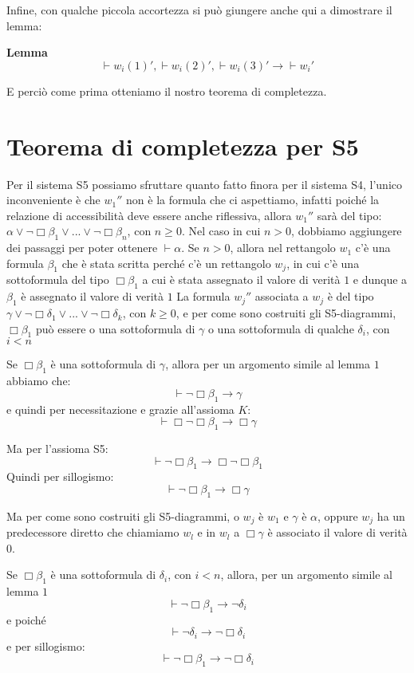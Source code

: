 \documentclass[a4paper, titlepage, 12pt]{report}
\begin{document}
Infine, con qualche piccola accortezza si può giungere anche qui a dimostrare il lemma:
\begin{flushleft}
\textbf{Lemma}
$$\vdash w_i(1)', \vdash w_i(2)', \vdash w_i(3)' \rightarrow \vdash w_i'$$
\end{flushleft}

E perciò come prima otteniamo il nostro teorema di completezza.

\section{Teorema di completezza per S5}
Per il sistema S5 possiamo sfruttare quanto fatto finora per il sistema S4,
l'unico inconveniente è che $w_1''$ non è la formula che ci aspettiamo,
infatti poiché la relazione di accessibilità deve essere anche riflessiva,
allora $w_1''$ sarà del tipo: $\alpha \lor \neg \Box \beta_1 \lor ... \lor \neg \Box \beta_n$,
con $n \ge 0$.
Nel caso in cui $n > 0$, dobbiamo aggiungere dei passaggi per poter ottenere $\vdash \alpha$.
Se $n > 0$, allora nel rettangolo $w_1$ c'è una formula $\beta_1$ che è stata scritta
perché c'è un rettangolo $w_j$,
in cui c'è una sottoformula del tipo $\Box \beta_1$
a cui è stata assegnato il valore di verità $1$ e dunque a $\beta_1$ è assegnato il valore di verità $1$
La formula $w_j''$ associata a $w_j$ è del tipo $\gamma \lor \neg \Box \delta_1 \lor ... \lor \neg \Box \delta_k$, con $k \ge 0$,
e per come sono costruiti gli S5-diagrammi, $\Box \beta_1$ può essere o una sottoformula di $\gamma$
o una sottoformula di qualche $\delta_i$, con $i < n$

Se $\Box \beta_1$ è una sottoformula di $\gamma$, allora per un argomento simile al lemma $1$ abbiamo che:
$$\vdash \neg \Box \beta_1 \rightarrow \gamma$$
e quindi per necessitazione e grazie all'assioma $K$:
$$\vdash \Box \neg \Box \beta_1 \rightarrow \Box \gamma$$

Ma per l'assioma S5:
$$\vdash \neg \Box \beta_1 \rightarrow \Box \neg \Box \beta_1$$
Quindi per sillogismo:
$$\vdash \neg \Box \beta_1 \rightarrow \Box \gamma$$

Ma per come sono costruiti gli S5-diagrammi, o $w_j$ è $w_1$ e $\gamma$ è $\alpha$,
oppure $w_j$ ha un predecessore diretto
che chiamiamo $w_l$ e in $w_l$ a $\Box \gamma$ è associato il valore di verità $0$.

Se $\Box \beta_1$ è una sottoformula di $\delta_i$, con $i < n$,
allora, per un argomento simile al lemma $1$
$$ \vdash \neg \Box \beta_1 \rightarrow \neg \delta_i$$
e poiché
$$ \vdash \neg \delta_i \rightarrow \neg \Box \delta_i$$
e per sillogismo:
$$ \vdash \neg \Box \beta_1 \rightarrow \neg \Box \delta_i$$
\end{document}
